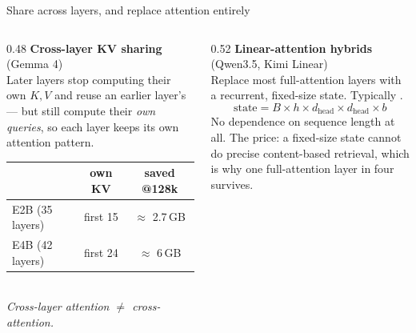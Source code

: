 \documentclass[aspectratio=169,10pt]{beamer}
\begin{document}
\begin{frame}{Share across layers, and replace attention entirely}
  \begin{columns}[T]
    \begin{column}{0.48\textwidth}
      \textbf{Cross-layer KV sharing} (Gemma 4)\\[0.3em]
      Later layers stop computing their own $K,V$ and reuse an earlier layer's
      --- but still compute their \emph{own queries}, so each layer keeps its
      own attention pattern.
      \vspace{0.4em}
      \small
      \begin{tabular}{@{}l c c@{}}
        \toprule
        & \textbf{own KV} & \textbf{saved @128k}\\
        \midrule
        E2B (35 layers) & first 15 & $\approx$ 2.7\,GB\\
        E4B (42 layers) & first 24 & $\approx$ 6\,GB\\
        \bottomrule
      \end{tabular}
      \vspace{0.4em}\\
      \textit{Cross-layer attention $\neq$ cross-attention.}
    \end{column}
    \begin{column}{0.52\textwidth}
      \textbf{Linear-attention hybrids} (Qwen3.5, Kimi Linear)\\[0.3em]
      Replace most full-attention layers with a recurrent, fixed-size state.
      Typically .
      \[
        \text{state} = B \times h \times d_{\text{head}} \times d_{\text{head}} \times b
      \]
      \alert{No dependence on sequence length at all.}
      \vspace{0.4em}
      \small
      The price: a fixed-size state cannot do precise content-based retrieval,
      which is why one full-attention layer in four survives.
    \end{column}
  \end{columns}
\end{frame}
\end{document}
